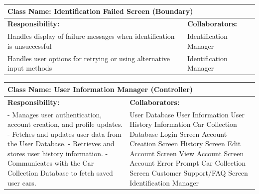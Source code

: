 \documentclass[]{article}
\begin{document}
\begin{table}[ht]
    \centering
    \begin{tabular}{|p{7cm}|p{7cm}|}
        \hline
        \multicolumn{2}{|l|}{\textbf{Class Name: Identification Failed Screen (Boundary)}} \\
        \hline
        \textbf{Responsibility:} & \textbf{Collaborators:} \\
        \hline
        Handles display of failure messages when identification is unsuccessful & Identification Manager \\
        Handles user options for retrying or using alternative input methods & Identification Manager \\
        \hline
    \end{tabular}
\end{table}	

\begin{table}[ht]
    \centering
    \begin{tabular}{|p{7cm}|p{7cm}|}
    \hline
     \multicolumn{2}{|l|}{\textbf{Class Name: User Information Manager (Controller)}} \\
    \hline
    \textbf{Responsibility:} & \textbf{Collaborators:} \\
    \hline
    - Manages user authentication, account creation, and profile updates. \newline
    - Fetches and updates user data from the User Database. \newline
    - Retrieves and stores user history information. \newline
    - Communicates with the Car Collection Database to fetch saved user cars.
    &
    User Database \newline
    User Information \newline
    User History Information \newline
    Car Collection Database \newline
    Login Screen \newline
    Account Creation Screen \newline
    History Screen \newline
    Edit Account Screen \newline
    View Account Screen \newline
    Account Error Prompt \newline
    Car Collection Screen \newline
    Customer Support/FAQ Screen \newline
    Identification Manager \\
    \hline
    \end{tabular}
\end{table}
\end{document}
